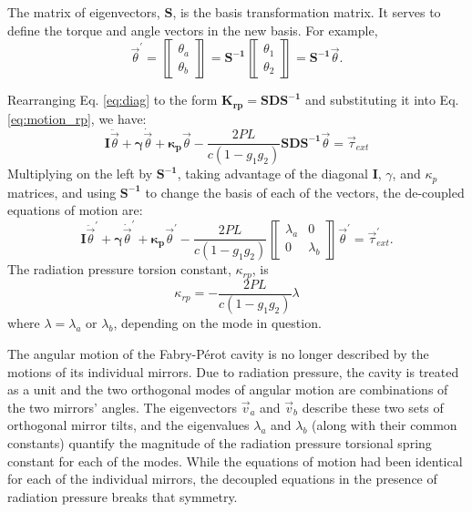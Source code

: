 The matrix of eigenvectors, $\mathbf{S}$, is the basis transformation
matrix. It serves to define the torque and angle vectors in the new
basis. For example,
\begin{equation}
\vec{\theta}^\prime = \left\llbracket \begin{array}{c}
\theta_a\\
\theta_b \end{array} \right\rrbracket = \mathbf{S^{-1}}
\left\llbracket \begin{array}{c}
\theta_1\\
\theta_2 \end{array} \right\rrbracket
= \mathbf{S^{-1}} \vec{\theta}.
\end{equation}

Rearranging Eq. \ref{eq:diag} to the form $\mathbf{K_{rp}} =
\mathbf{S D S^{-1}}$ and substituting it into Eq. \ref{eq:motion_rp},
we have:
\begin{equation}
\mathbf{I} \ddot{\vec{\theta}} 
+ {\bm \gamma} \dot{\vec{\theta}} 
+ \mathbf{\kappa_p} \vec{\theta}
- \frac{2 P L}{c (1-g_1 g_2)} \mathbf{S D S^{-1}} \vec{\theta} 
= \vec{\tau}_{ext} 
\end{equation}
Multiplying on the left by $\mathbf{S^{-1}}$, taking advantage of the
diagonal $\mathbf{I}$, $\gamma$, and $\kappa_p$ matrices, and using
$\mathbf{S^{-1}}$ to change the basis of each of the vectors, the
de-coupled equations of motion are:
\begin{equation}
\mathbf{I} \ddot{\vec{\theta}}^\prime 
+ {\bm \gamma} \dot{\vec{\theta}}^\prime 
+ \mathbf{\kappa_p} \vec{\theta}^\prime
- \frac{2 P L}{c (1-g_1 g_2)}
\left\llbracket \begin{array}{cc}
\lambda_a & 0\\
0 & \lambda_b \end{array} \right\rrbracket \vec{\theta}^\prime 
= \vec{\tau}_{ext}^\prime.
\label{eq:rp_eqmotion}
\end{equation}
The radiation pressure torsion constant, $\kappa_{rp}$, is 
\begin{equation}
\kappa_{rp} = - \frac{2 P L}{c (1-g_1 g_2)} \lambda
\end{equation}
where $\lambda = \lambda_a$ or $\lambda_b$, depending on the mode in
question. 

The angular motion of the Fabry-P\'{e}rot cavity is no longer
described by the motions of its individual mirrors. Due to radiation
pressure, the cavity is treated as a unit and the two orthogonal modes
of angular motion are combinations of the two mirrors' angles. The
eigenvectors $\vec{v}_a$ and $\vec{v}_b$ describe these two sets of
orthogonal mirror tilts, and the eigenvalues $\lambda_a$ and
$\lambda_b$ (along with their common constants) quantify the magnitude
of the radiation pressure torsional spring constant for each of the
modes. While the equations of motion had been identical for each of
the individual mirrors, the decoupled equations in the presence of
radiation pressure breaks that symmetry.


